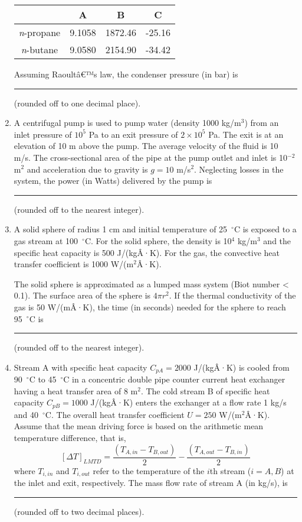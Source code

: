 \documentclass[12pt]{article}
\begin{document}
\begin{enumerate}[label=Q.\arabic*]
			\begin{center}
				\begin{tabular}{|c|c|c|c|}
					\hline
					& A & B & C \\
					\hline
					\emph{n}-propane & 9.1058 & 1872.46 & -25.16 \\
					\emph{n}-butane & 9.0580 & 2154.90 & -34.42 \\
					\hline
				\end{tabular}
			\end{center}

			Assuming Raoultâ€™s law, the condenser pressure (in bar) is \rule{3cm}{0.15mm} (rounded off to one decimal place).

		\item A centrifugal pump is used to pump water (density 1000 kg/m$^3$) from an inlet pressure of $10^5$ Pa to an exit pressure of $2 \times 10^5$ Pa. The exit is at an elevation of 10 m above the pump. The average velocity of the fluid is 10 m/s. The cross-sectional area of the pipe at the pump outlet and inlet is 10$^{-2}$ m$^2$ and acceleration due to gravity is $g = 10$ m/s$^2$. Neglecting losses in the system, the power (in Watts) delivered by the pump is \rule{3cm}{0.15mm} (rounded off to the nearest integer).

		\item A solid sphere of radius 1 cm and initial temperature of 25~$^\circ$C is exposed to a gas stream at 100~$^\circ$C. For the solid sphere, the density is 10$^4$ kg/m$^3$ and the specific heat capacity is 500 J/(kgÂ·K). For the gas, the convective heat transfer coefficient is 1000 W/(m$^2$Â·K).

			The solid sphere is approximated as a lumped mass system (Biot number \textless{} 0.1). The surface area of the sphere is $4 \pi r^2$. If the thermal conductivity of the gas is 50 W/(mÂ·K), the time (in seconds) needed for the sphere to reach 95~$^\circ$C is \rule{3cm}{0.15mm} (rounded off to the nearest integer).

		\item Stream A with specific heat capacity $C_{pA} = 2000$ J/(kgÂ·K) is cooled from 90~$^\circ$C to 45~$^\circ$C in a concentric double pipe counter current heat exchanger having a heat transfer area of 8 m$^2$. The cold stream B of specific heat capacity $C_{pB} = 1000$ J/(kgÂ·K) enters the exchanger at a flow rate 1 kg/s and 40~$^\circ$C. The overall heat transfer coefficient $U = 250$ W/(m$^2$Â·K). Assume that the mean driving force is based on the arithmetic mean temperature difference, that is,
			\[ \left[ \Delta T \right]_{LMTD} = \frac{\left( T_{A,in} - T_{B,out} \right)}{2} - \frac{\left( T_{A,out} - T_{B,in} \right)}{2} \]
			where $T_{i,in}$ and $T_{i,out}$ refer to the temperature of the $i$th stream ($i = A, B$) at the inlet and exit, respectively. The mass flow rate of stream A (in kg/s), is \rule{3cm}{0.15mm} (rounded off to two decimal places).


\end{enumerate}
\end{document}
